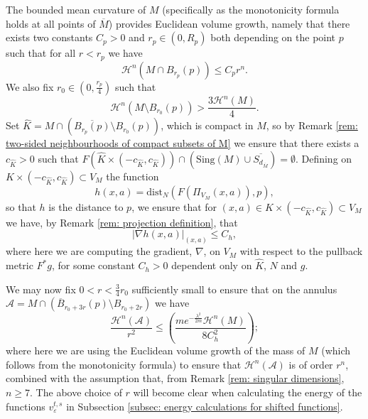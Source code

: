 \documentclass[11pt]{article}
\begin{document}
The bounded mean curvature of $M$ (specifically as the monotonicity formula holds at all points of $\overline{M}$) provides Euclidean volume growth, namely that there exists two constants $C_p > 0$ and $r_p \in (0,R_p)$ both depending on the point $p$ such that for all $r < r_p$ we have
\begin{equation}\label{eqn: monotonicity gives euclidean volume growth for M around p}
   \mathcal{H}^n(M \cap B_{r_p}(p)) \leq C_pr^n.
\end{equation}
We also fix $r_0 \in (0, \frac{r_p}{4})$ such that 
\begin{equation}\label{eqn: fixed amount of M outside a ball}
    \mathcal{H}^n(M \setminus B_{r_0}(p)) > \frac{3\mathcal{H}^n(M)}{4}.
\end{equation}
Set $\widehat{K} = M \cap (\overline{B_{r_p}(p)} \setminus B_{r_0}(p))$, which is compact in $M$, so by Remark \ref{rem: two-sided neighbourhoods of compact subsets of M} we ensure that there exists a $c_{\widehat{K}} > 0$ such that $F(\widehat{K} \times (-c_{\widehat{K}}, c_{\widehat{K}})) \cap (\mathrm{Sing}(M) \cup \overline{S_{d_{\overline{M}}}}) = \emptyset$. Defining on $K \times (-c_{\widehat{K}},c_{\widehat{K}}) \subset V_M$ the function
\begin{equation}\label{eqn: definition of h}
    h(x,a) = \mathrm{dist}_N(F(\Pi_{V_M}(x,a)),p),
\end{equation}
so that $h$ is the distance to $p$, we ensure that for $(x,a) \in K \times (-c_{\widehat{K}},c_{\widehat{K}}) \subset V_M$ we have, by Remark \ref{rem: projection definition}, that
\begin{equation}\label{eqn: gradient bound for h}
    |\nabla h(x,a)|_{(x,a)} \leq C_h,
\end{equation}
where here we are computing the gradient, $\nabla$, on $V_M$ with respect to the pullback metric $F^*g$, for some constant $C_h > 0$ dependent only on $\widehat{K}$, $N$ and $g$.

\bigskip

We may now fix $0 < r < \frac{3}{4}r_0$ sufficiently small to ensure that on the annulus $\mathcal{A} = M \cap (\overline{B}_{r_0 + 3r}(p) \setminus B_{r_0 +2r})$ we have
\begin{equation}\label{eqn: annulus ratio for energy drop}
    \frac{\mathcal{H}^n(\mathcal{A})}{r^2} \leq \left(\frac{me^{-\frac{\lambda^2}{2m}}\mathcal{H}^n(M)}{8C^2_h} \right);
\end{equation}
where here we are using the Euclidean volume growth of the mass of $M$ (which follows from the monotonicity formula) to ensure that $\mathcal{H}^n(\mathcal{A})$ is of order $r^n$, combined with the assumption that, from Remark \ref{rem: singular dimensions}, $n \geq 7$. The above choice of $r$ will become clear when calculating the energy of the functions $v^{t,s}_\varepsilon$ in Subsection \ref{subsec: energy calculations for shifted functions}.
\end{document}
